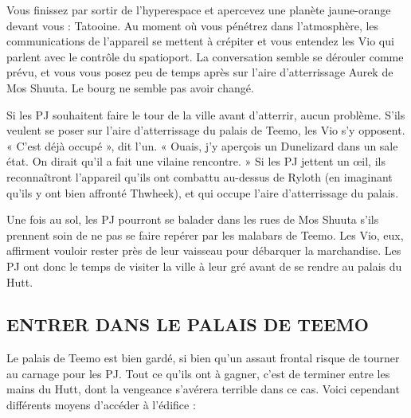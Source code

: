 \documentclass[a4paper,10pt,twoside,twocolumn,openany]{book}
\begin{document}
\begin{quotebox}
    
Vous finissez par sortir de l’hyperespace et apercevez une planète jaune-orange devant vous :
Tatooine. Au moment où vous pénétrez dans
l’atmosphère, les communications de l’appareil
se mettent à crépiter et vous entendez les Vio
qui parlent avec le contrôle du spatioport. La
conversation semble se dérouler comme prévu,
et vous vous posez peu de temps après sur l’aire
d’atterrissage Aurek de Mos Shuuta. Le bourg ne
semble pas avoir changé.
\end{quotebox}

Si les PJ souhaitent faire le tour de la ville avant d’atterrir, aucun problème. S’ils veulent se poser sur l’aire
d’atterrissage du palais de Teemo, les Vio s’y opposent.
« C’est déjà occupé », dit l’un. « Ouais, j’y aperçois un
Dunelizard dans un sale état. On dirait qu’il a fait une
vilaine rencontre. » Si les PJ jettent un œil, ils reconnaîtront l’appareil qu’ils ont combattu au-dessus de Ryloth
(en imaginant qu’ils y ont bien affronté Thwheek), et qui
occupe l’aire d’atterrissage du palais.

Une fois au sol, les PJ pourront se balader dans les
rues de Mos Shuuta s’ils prennent soin de ne pas se
faire repérer par les malabars de Teemo. Les Vio, eux,
affirment vouloir rester près de leur vaisseau pour débarquer la marchandise. Les PJ ont donc le temps de
visiter la ville à leur gré avant de se rendre au palais
du Hutt.

\subsection{ENTRER DANS
LE PALAIS DE TEEMO}

Le palais de Teemo est bien gardé, si bien qu’un assaut
frontal risque de tourner au carnage pour les PJ. Tout
ce qu’ils ont à gagner, c’est de terminer entre les mains
du Hutt, dont la vengeance s’avérera terrible dans ce
cas. Voici cependant différents moyens d’accéder à
l’édifice :
\end{document}
